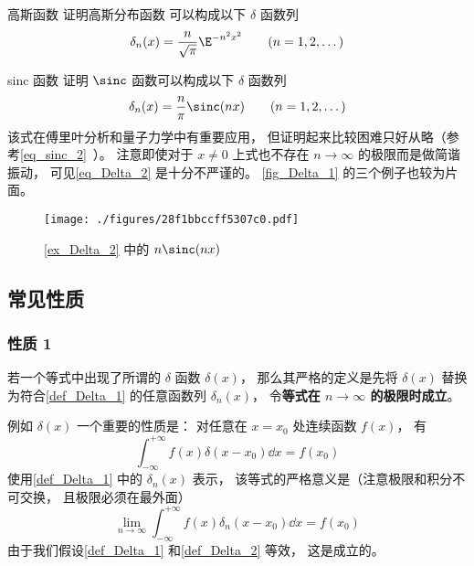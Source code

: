 \begin{exercise}{高斯函数}\label{exe_Delta_2}
证明高斯分布函数 可以构成以下 $\delta$ 函数列
\begin{equation}
\delta_n(x) = \frac{n}{\sqrt{\pi}} \E^{-{n ^2}x^2} \qquad (n = 1, 2, \dots)
\end{equation}
\end{exercise}

\begin{example}{sinc 函数}\label{ex_Delta_2}
证明 $\sinc$ 函数可以构成以下 $\delta$ 函数列
\begin{equation}\label{eq_Delta_10}
\delta_n(x) = \frac{n}{\pi}\sinc(n x) \qquad (n = 1, 2, \dots)
\end{equation}
该式在傅里叶分析和量子力学中有重要应用\cite{Arfken}， 但证明起来比较困难只好从略（参考\autoref{eq_sinc_2}~）。 注意即使对于 $x \ne 0$ 上式也不存在 $n\to\infty$ 的极限而是做简谐振动， 可见\autoref{eq_Delta_2} 是十分不严谨的。 \autoref{fig_Delta_1} 的三个例子也较为片面。
\end{example}
\begin{figure}[ht]
\centering
\texttt{[image: ./figures/28f1bbccff5307c0.pdf]}
\caption{\autoref{ex_Delta_2} 中的 $n\sinc(n x)$} \label{fig_Delta_2}
\end{figure}

\subsection{常见性质}
\subsubsection{性质 1}
若一个等式中出现了所谓的 $\delta$ 函数 $\delta(x)$， 那么其严格的定义是先将 $\delta(x)$ 替换为符合\autoref{def_Delta_1} 的任意函数列 $\delta_n(x)$， 令\textbf{等式在 $n\to\infty$ 的极限时成立}。

例如 $\delta(x)$ 一个重要的性质是： 对任意在 $x = x_0$ 处连续函数 $f(x)$， 有
\begin{equation}\label{eq_Delta_7}
\int_{-\infty}^{+\infty} f(x) \delta(x - x_0) \dd{x}= f(x_0)
\end{equation}
使用\autoref{def_Delta_1} 中的 $\delta_n(x)$ 表示， 该等式的严格意义是（注意极限和积分不可交换， 且极限必须在最外面）
\begin{equation}\label{eq_Delta_11}
\lim_{n\to\infty}\int_{-\infty}^{+\infty} f(x) \delta_n(x - x_0) \dd{x}= f(x_0)
\end{equation}
由于我们假设\autoref{def_Delta_1} 和\autoref{def_Delta_2} 等效， 这是成立的。

